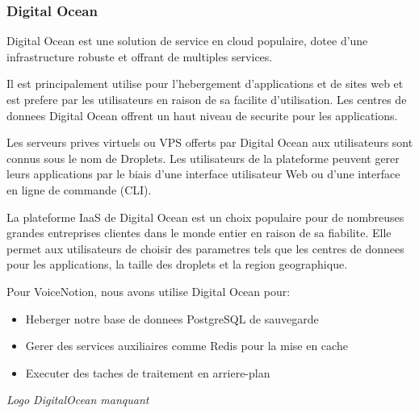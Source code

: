 \subsubsection{Digital Ocean}
\begin{minipage}{0.7\textwidth}
Digital Ocean est une solution de service en cloud populaire, dotee d'une infrastructure robuste et offrant de multiples services.

Il est principalement utilise pour l'hebergement d'applications et de sites web et est prefere par les utilisateurs en raison de sa facilite d'utilisation. Les centres de donnees Digital Ocean offrent un haut niveau de securite pour les applications.

Les serveurs prives virtuels ou VPS offerts par Digital Ocean aux utilisateurs sont connus sous le nom de Droplets. Les utilisateurs de la plateforme peuvent gerer leurs applications par le biais d'une interface utilisateur Web ou d'une interface en ligne de commande (CLI).

La plateforme IaaS de Digital Ocean est un choix populaire pour de nombreuses grandes entreprises clientes dans le monde entier en raison de sa fiabilite. Elle permet aux utilisateurs de choisir des parametres tels que les centres de donnees pour les applications, la taille des droplets et la region geographique.

Pour VoiceNotion, nous avons utilise Digital Ocean pour:
\begin{itemize}
    \item Heberger notre base de donnees PostgreSQL de sauvegarde
    \item Gerer des services auxiliaires comme Redis pour la mise en cache
    \item Executer des taches de traitement en arriere-plan
\end{itemize}
\end{minipage}%
\hfill
\begin{minipage}{0.25\textwidth}
\centering
\textit{Logo DigitalOcean manquant}
\end{minipage}

